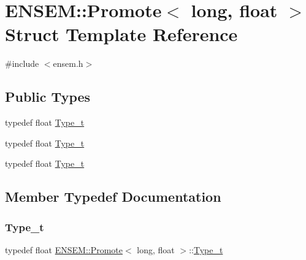 \hypertarget{structENSEM_1_1Promote_3_01long_00_01float_01_4}{}\section{E\+N\+S\+EM\+:\+:Promote$<$ long, float $>$ Struct Template Reference}
\label{structENSEM_1_1Promote_3_01long_00_01float_01_4}


{\ttfamily \#include $<$ensem.\+h$>$}

\subsection*{Public Types}
\begin{DoxyCompactItemize}
\item 
typedef float \mbox{\hyperlink{structENSEM_1_1Promote_3_01long_00_01float_01_4_a465824ec9d8cc7704bf91ba4cdeafaad}{Type\+\_\+t}}
\item 
typedef float \mbox{\hyperlink{structENSEM_1_1Promote_3_01long_00_01float_01_4_a465824ec9d8cc7704bf91ba4cdeafaad}{Type\+\_\+t}}
\item 
typedef float \mbox{\hyperlink{structENSEM_1_1Promote_3_01long_00_01float_01_4_a465824ec9d8cc7704bf91ba4cdeafaad}{Type\+\_\+t}}
\end{DoxyCompactItemize}


\subsection{Member Typedef Documentation}
\mbox{\label{structENSEM_1_1Promote_3_01long_00_01float_01_4_a465824ec9d8cc7704bf91ba4cdeafaad}} 
\subsubsection{\texorpdfstring{Type\_t}{Type\_t}\hspace{0.1cm}{\footnotesize\ttfamily [1/3]}}
{\footnotesize\ttfamily typedef float \mbox{\hyperlink{structENSEM_1_1Promote}{E\+N\+S\+E\+M\+::\+Promote}}$<$ long, float $>$\+::\mbox{\hyperlink{structENSEM_1_1Promote_3_01long_00_01float_01_4_a465824ec9d8cc7704bf91ba4cdeafaad}{Type\+\_\+t}}}

